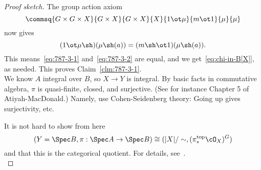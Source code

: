 \begin{proof}[Proof sketch]
%
%
The group action axiom
\[
\commsq{G\times G\times X}{G\times X}{G\times X}{X}{1\ot \mu}{m\ot 1}{\mu}{\mu}
\]
now gives
\[
(1\ot\mu\sh)(\mu\sh(a))=(m\sh \ot 1)(\mu\sh(a)).
\]
This means~\eqref{eq:787-3-1} and~\eqref{eq:787-3-2} are equal, and we get~\eqref{eq:chi-in-B[X]}, as needed. This proves Claim~\ref{clm:787-3-1}.\\
%

We know $A$ integral over $B$, so $X\to Y$ is integral. By basic facts in commutative algebra, $\pi$ is quasi-finite, closed, and surjective. (See for instance Chapter 5 of Atiyah-MacDonald.) Namely, use Cohen-Seidenberg theory: Going up gives surjectivity, etc.

It is not hard to show from here
\[
(Y=\Spec B,\pi:\Spec A\to \Spec B)\cong (|X|/\sim,(\pi_*^{\text{top}}\cO_X)^G)
\]
and that this is the categorical quotient. 
For details, see~\cite[4.21--22]{GGBM}.\\


\end{proof}
